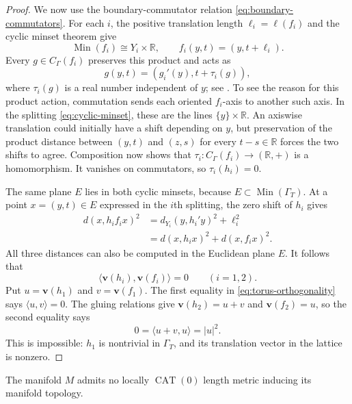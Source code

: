 \begin{proof}
We now use the boundary-commutator relation
\eqref{eq:boundary-commutators}.  For each $i$, the positive translation
length $\ell_i=\ell(f_i)$ and the cyclic minset theorem give
\begin{equation}\label{eq:cyclic-minset}
 \operatorname{Min}(f_i)\cong Y_i\times\mathbb R,
 \qquad f_i(y,t)=(y,t+\ell_i).
\end{equation}
Every $g\in C_\Gamma(f_i)$ preserves this product and acts as
\[
 g(y,t)=(g_i'(y),t+\tau_i(g)),
\]
where $\tau_i(g)$ is a real number independent of $y$;
see \cite[Theorem~II.6.8(4)--(5)]{BridsonHaefliger1999}.
To see the reason for this product action, commutation sends each oriented
$f_i$-axis to another such axis.  In the splitting
\eqref{eq:cyclic-minset}, these are the lines $\{y\}\times\mathbb R$.
An axiswise translation could initially have a shift depending on $y$,
but preservation of the product distance between $(y,t)$ and $(z,s)$
for every $t-s\in\mathbb R$ forces the two shifts to agree.
Composition now shows that
$\tau_i:C_\Gamma(f_i)\longrightarrow(\mathbb R,+)$ is a homomorphism.
It vanishes on commutators, so $\tau_i(h_i)=0$.

The same plane $E$ lies in both cyclic minsets, because
$E\subset\operatorname{Min}(\Gamma_T)$.  At a point $x=(y,t)\in E$ expressed
in the $i$th splitting, the zero shift of $h_i$ gives
\[
 \begin{aligned}
 d(x,h_if_ix)^2
 &=d_{Y_i}(y,h_i'y)^2+\ell_i^2\\
 &=d(x,h_ix)^2+d(x,f_ix)^2.
 \end{aligned}
\]
All three distances can also be computed in the Euclidean plane $E$.
It follows that
\begin{equation}\label{eq:torus-orthogonality}
 \langle\mathbf v(h_i),\mathbf v(f_i)\rangle=0
 \qquad(i=1,2).
\end{equation}
Put $u=\mathbf v(h_1)$ and $v=\mathbf v(f_1)$.
The first equality in \eqref{eq:torus-orthogonality} says
$\langle u,v\rangle=0$.  The gluing relations give
$\mathbf v(h_2)=u+v$ and $\mathbf v(f_2)=u$, so the second equality says
\[
 0=\langle u+v,u\rangle=|u|^2.
\]
This is impossible: $h_1$ is nontrivial in $\Gamma_T$, and its translation vector
in the lattice is nonzero.
\end{proof}

\begin{corollary}\label{cor:no-local-cat0}
The manifold $M$ admits no locally $\operatorname{CAT}(0)$ length metric
inducing its manifold topology.
\end{corollary}

